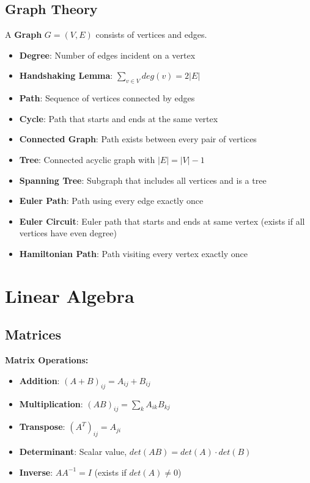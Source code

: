 \documentclass[12pt,a4paper]{report}
\begin{document}
\subsection{Graph Theory}
\begin{concept}
A \textbf{Graph} $G = (V, E)$ consists of vertices and edges.
\begin{itemize}
    \item \textbf{Degree}: Number of edges incident on a vertex
    \item \textbf{Handshaking Lemma}: $\sum_{v \in V} deg(v) = 2|E|$
    \item \textbf{Path}: Sequence of vertices connected by edges
    \item \textbf{Cycle}: Path that starts and ends at the same vertex
    \item \textbf{Connected Graph}: Path exists between every pair of vertices
    \item \textbf{Tree}: Connected acyclic graph with $|E| = |V| - 1$
    \item \textbf{Spanning Tree}: Subgraph that includes all vertices and is a tree
    \item \textbf{Euler Path}: Path using every edge exactly once
    \item \textbf{Euler Circuit}: Euler path that starts and ends at same vertex (exists if all vertices have even degree)
    \item \textbf{Hamiltonian Path}: Path visiting every vertex exactly once
\end{itemize}
\end{concept}

\section{Linear Algebra}

\subsection{Matrices}
\begin{concept}
\textbf{Matrix Operations:}
\begin{itemize}
    \item \textbf{Addition}: $(A + B)_{ij} = A_{ij} + B_{ij}$
    \item \textbf{Multiplication}: $(AB)_{ij} = \sum_k A_{ik}B_{kj}$
    \item \textbf{Transpose}: $(A^T)_{ij} = A_{ji}$
    \item \textbf{Determinant}: Scalar value, $det(AB) = det(A) \cdot det(B)$
    \item \textbf{Inverse}: $AA^{-1} = I$ (exists if $det(A) \neq 0$)
\end{itemize}
\end{concept}
\end{document}
